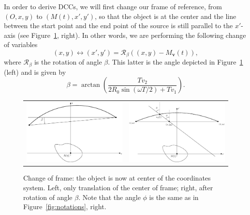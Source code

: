 \documentclass[a4paper]{article}
\numberwithin{equation}{section}
\newcommand{\Mbv}{M_{\mathbf{v}}}
\begin{document}
In order to derive DCCs, we will first change our frame of reference, from $\left(O, x, y\right)$ to $\left(M(t), x', y'\right)$, so that the object is at the center and the line between the start point and the end point of the source is still parallel to the $x'$-axis (see Figure~\ref{fig:change_frame}, right). In other words, we are performing the following change of variables
\begin{equation}
	(x,y) \leftrightarrow (x',y') = \mathcal{R}_{\beta} \left( (x,y)-\Mbv(t) \right),
\end{equation}
where $\mathcal{R}_{\beta}$ is the rotation of angle $\beta$. This latter is the angle depicted in Figure~\ref{fig:change_frame} (left) and is given by
\begin{equation}
	\beta = \arctan \left( \frac{T v_2}{2R_0 \sin(\omega T/2) + T v_1} \right).
\end{equation}

\begin{figure}[!ht]
	\centering
	\begin{tabular}{cc}
	\includegraphics[width=8cm]{figs/frame_object_before_rotation.eps} &
	\includegraphics[width=8cm]{figs/frame_object.eps}
	\end{tabular}
	\caption{Change of frame: the object is now at center of the coordinates system. Left, only translation of the center of frame; right, after rotation of angle $\beta$. Note that the angle $\phi$ is the same as in Figure~\ref{fig:notations}, right.\label{fig:change_frame}}
\end{figure}
\end{document}
